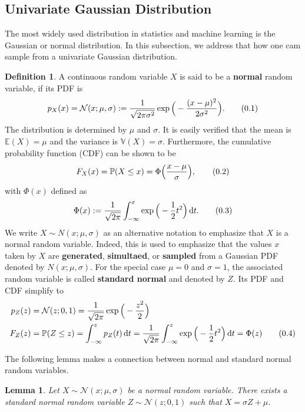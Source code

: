 \documentclass[10pt]{article}
\newtheorem{lem}[thm]{Lemma}
\theoremstyle{definition}
\newtheorem{defn}{Definition}[section]
\newcommand\eqnum{\addtocounter{equation}{1}\tag{\arabic{section}.\arabic{equation}}}
\DeclareMathOperator{\df}{d\!}
\begin{document}
\subsection{Univariate Gaussian Distribution}
The most widely used distribution in statistics and machine learning is the Gaussian or normal distribution. In this subsection, we address that how one cam sample from a univariate Gaussian distribution.
\begin{defn}
A continuous random variable $X$ is said to be a \textbf{normal} random variable, if its PDF is
\begin{equation*}
p_{X}(x) = \mathcal{N}(x; \mu, \sigma) := \frac{1}{\sqrt{2\pi\sigma^2}}\exp\Big(-\frac{(x-\mu)^2}{2\sigma^2}\Big).
\eqnum
\end{equation*}
The distribution is determined by $\mu$ and $\sigma$. It is easily verified that the mean is $\mathbb{E}(X) = \mu$ and the variance is $\mathbb{V}(X)=\sigma$. Furthermore, the cumulative probability function (CDF) can be shown to be
\begin{equation*}
F_{X}(x) = \mathbb{P}(X \leq x) = \Phi\Big(\frac{x-\mu}{\sigma}\Big),
\eqnum
\end{equation*}
with $\Phi(x)$ defined as
\begin{equation*}
\Phi(x) := \frac{1}{\sqrt{2\pi}}\int_{-\infty}^{x}\exp\Big(-\frac{1}{2}t^2\Big)\df t.
\eqnum
\end{equation*}
We write $X\sim N(x; \mu, \sigma)$ as an alternative notation to emphasize that $X$ is a normal random variable. Indeed, this is used to emphasize that the values $x$ taken by $X$ are \textbf{generated}, \textbf{simultaed}, or \textbf{sampled} from a Gaussian PDF denoted by $N(x; \mu, \sigma)$. For the special case $\mu = 0$ and $\sigma = 1$, the associated random variable is called \textbf{standard normal} and denoted by $Z$. Its PDF and CDF simplify to
\begin{align*}
p_{Z}(z) &= \mathcal{N}(z; 0, 1) = \frac{1}{\sqrt{2\pi}}\exp\Big(-\frac{z^2}{2}\Big) \\
F_Z(z) &= \mathbb{P}(Z\leq z) = \int_{-\infty}^{z}p_Z(t)\df t = 
\frac{1}{\sqrt{2\pi}}\int_{-\infty}^{z}\exp\Big(-\frac{1}{2}t^2\Big)\df t = \Phi(z)
\eqnum
\end{align*}
\end{defn}
\noindent
The following lemma makes a connection between normal and standard normal random variables.
\begin{lem}
Let $X\sim\mathcal{N}(x; \mu, \sigma)$ be a normal random variable. There exists a standard normal random variable $Z\sim\mathcal{N}(z; 0, 1)$ such that $X=\sigma Z + \mu$.
\end{lem}
\end{document}
